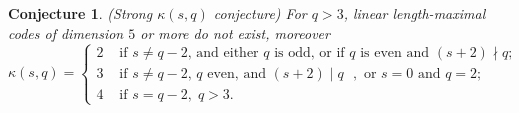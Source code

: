 \documentclass[11pt,a4paper]{amsart}
\theoremstyle{plain}
\newtheorem{conjecture}[theorem]{Conjecture}
\theoremstyle{definition}
\theoremstyle{remark}
\begin{document}
	\begin{conjecture} (Strong $\kappa(s,q)$ conjecture)
		For $q>3$, linear length-maximal codes of dimension $5$ or more do not exist, moreover
		\begin{equation*}
			\kappa(s,q) = \left\{ \begin{array}{cl}
				2	& \text{ if $s\ne q-2$, and either $q$ is odd, or if $q$ is even and } (s+2)\nmid q;  \\
				3	&  \text{ if $s\ne q-2$, $q$ even, and $(s+2)\mid q$ },\text{ or } s=0\text{ and } q=2;   \\
				4	& \text{ if } s=q-2,\; q>3. %
			\end{array} \right.
		\end{equation*}

	\end{conjecture}

	\providecommand{\bysame}{\leavevmode\hbox to3em{\hrulefill}\thinspace}
	\providecommand{\MR}{\relax\ifhmode\unskip\space\fi MR }
	\providecommand{\MRhref}[2]{%
		\href{http://www.ams.org/mathscinet-getitem?mr=#1}{#2}
	}
	\providecommand{\href}[2]{#2}
\end{document}
